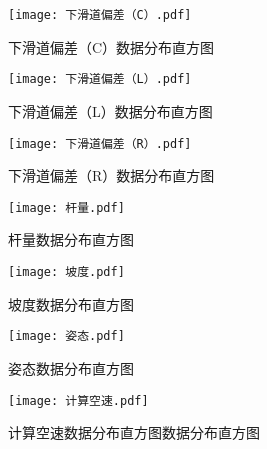 \documentclass{MathorCupModeling}
\begin{document}
	\begin{figure}[H]
		\centering
		\begin{minipage}{0.48\linewidth}
			\centering
			\texttt{[image: 下滑道偏差（C）.pdf]}
			\caption{下滑道偏差（C）数据分布直方图}
			\label{fig:下滑道偏差（C）}
		\end{minipage}
		\begin{minipage}{0.48\linewidth}
			\centering
			\texttt{[image: 下滑道偏差（L）.pdf]}
			\caption{下滑道偏差（L）数据分布直方图}
			\label{fig:下滑道偏差（L）}
		\end{minipage}
	\end{figure}
	\begin{figure}[H]
		\centering
		\begin{minipage}{0.48\linewidth}
			\centering
			\texttt{[image: 下滑道偏差（R）.pdf]}
			\caption{下滑道偏差（R）数据分布直方图}
			\label{fig:下滑道偏差（R）}
		\end{minipage}
		\begin{minipage}{0.48\linewidth}
			\centering
			\texttt{[image: 杆量.pdf]}
			\caption{杆量数据分布直方图}
			\label{fig:杆量}
		\end{minipage}
	\end{figure}
	\begin{figure}[H]
		\centering
		\begin{minipage}{0.48\linewidth}
			\centering
			\texttt{[image: 坡度.pdf]}
			\caption{坡度数据分布直方图}
			\label{fig:坡度}
		\end{minipage}
		\begin{minipage}{0.48\linewidth}
			\centering
			\texttt{[image: 姿态.pdf]}
			\caption{姿态数据分布直方图}
			\label{fig:姿态}
		\end{minipage}
	\end{figure}
	\begin{figure}[H]
		\centering
		\texttt{[image: 计算空速.pdf]}
		\caption{计算空速数据分布直方图数据分布直方图}
		\label{fig:计算空速}
	\end{figure}
\end{document}
